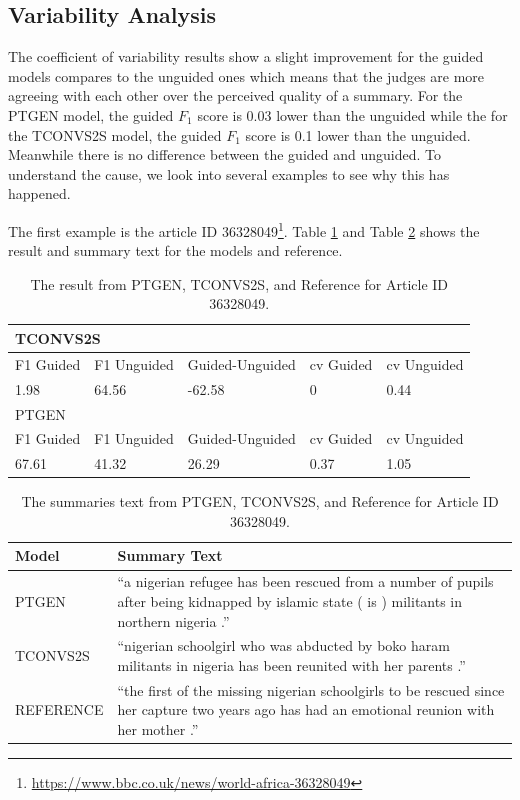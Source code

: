\documentclass[11pt,a4paper]{article}
\begin{document}
\subsection{Variability Analysis}
The coefficient of variability results show a slight improvement for the guided models compares to the unguided ones which means that the judges are more agreeing with each other over the perceived quality of a summary. For the PTGEN model, the guided $F_1$ score is 0.03 lower than the unguided while the for the TCONVS2S model, the guided $F_1$ score is 0.1 lower than the unguided. Meanwhile there is no difference between the guided and unguided. To understand the cause, we look into several examples to see why this has happened. 

The first example is the article ID 36328049\footnote{\url{https://www.bbc.co.uk/news/world-africa-36328049}}. Table \ref{table:result36328049} and Table \ref{table:example36328049} shows the result and summary text for the models and reference.

\begin{table}[h!]
  \small
  \begin{tabular}{p{1cm}p{1cm}p{1cm}p{1cm}p{1cm}}
    \hline
  \multicolumn{5}{l}{TCONVS2S} \\
  \hline                                
  F1 Guided & F1 Unguided & Guided-Unguided & cv Guided & cv Unguided \\
  1.98      & 64.56       & -62.58   & 0         & 0.44        \\
  \hline
  \multicolumn{5}{l}{PTGEN}    \\
  \hline                                
  F1 Guided & F1 Unguided & Guided-Unguided & cv Guided & cv Unguided \\
  67.61     & 41.32       & 26.29    & 0.37      & 1.05       
\end{tabular}
\caption{The result from PTGEN, TCONVS2S, and Reference for Article ID 36328049.}
\label{table:result36328049}
\end{table}

\begin{table}[h!]
  \small
  \begin{tabular}{lp{5cm}}
  Model     & Summary Text   \\
  \hline
  PTGEN     & “a nigerian refugee has been rescued from a number of pupils after being kidnapped by islamic state ( is ) militants in northern nigeria .”   \\
  TCONVS2S  & “nigerian schoolgirl who was abducted by boko haram militants in nigeria has been reunited with her parents .”                                        \\
  REFERENCE & “the first of the missing nigerian schoolgirls to be rescued since her capture two years ago has had an emotional reunion with her mother .”         
  \end{tabular}
  \caption{The summaries text from PTGEN, TCONVS2S, and Reference for Article ID 36328049.}
  \label{table:example36328049}
\end{table}
\end{document}
